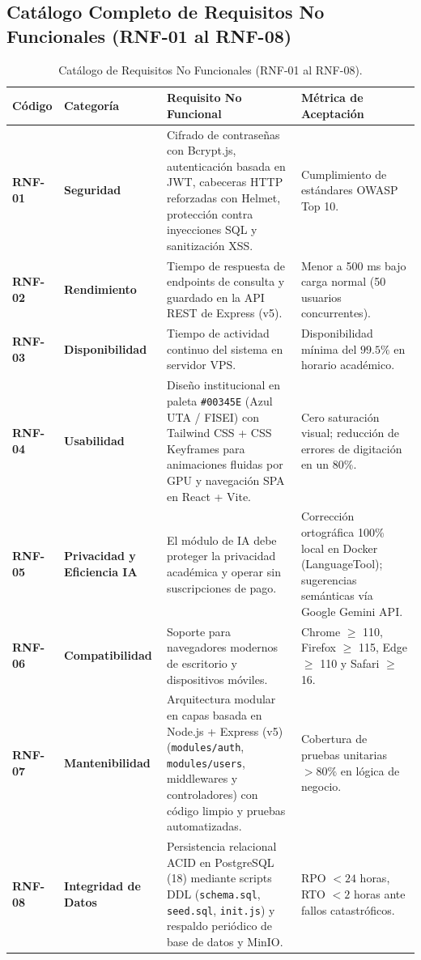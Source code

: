 \documentclass[12pt,a4paper]{article}
\begin{document}
\subsection{Catálogo Completo de Requisitos No Funcionales (RNF-01 al RNF-08)}
\begin{table}[htbp]
\centering
\small
\begin{tabularx}{\textwidth}{|>{\hsize=0.35\hsize\bfseries\centering\arraybackslash}X|>{\hsize=0.65\hsize\bfseries}X|>{\hsize=1.0\hsize}X|>{\hsize=1.0\hsize}X|}
    \hline
    \rowcolor{tableheader}
    Código & Categoría & Requisito No Funcional & Métrica de Aceptación \\
    \hline
    RNF-01 & Seguridad & Cifrado de contraseñas con Bcrypt.js, autenticación basada en JWT, cabeceras HTTP reforzadas con Helmet, protección contra inyecciones SQL y sanitización XSS. & Cumplimiento de estándares OWASP Top 10. \\
    \hline
    RNF-02 & Rendimiento & Tiempo de respuesta de endpoints de consulta y guardado en la API REST de Express (v5). & Menor a 500 ms bajo carga normal (50 usuarios concurrentes). \\
    \hline
    RNF-03 & Disponibilidad & Tiempo de actividad continuo del sistema en servidor VPS. & Disponibilidad mínima del $99.5\%$ en horario académico. \\
    \hline
    RNF-04 & Usabilidad & Diseño institucional en paleta \texttt{\#00345E} (Azul UTA / FISEI) con Tailwind CSS + CSS Keyframes para animaciones fluidas por GPU y navegación SPA en React + Vite. & Cero saturación visual; reducción de errores de digitación en un $80\%$. \\
    \hline
    RNF-05 & Privacidad y Eficiencia IA & El módulo de IA debe proteger la privacidad académica y operar sin suscripciones de pago. & Corrección ortográfica 100\% local en Docker (LanguageTool); sugerencias semánticas vía Google Gemini API. \\
    \hline
    RNF-06 & Compatibilidad & Soporte para navegadores modernos de escritorio y dispositivos móviles. & Chrome $\ge$ 110, Firefox $\ge$ 115, Edge $\ge$ 110 y Safari $\ge$ 16. \\
    \hline
    RNF-07 & Mantenibilidad & Arquitectura modular en capas basada en Node.js + Express (v5) (\texttt{modules/auth}, \texttt{modules/users}, middlewares y controladores) con código limpio y pruebas automatizadas. & Cobertura de pruebas unitarias $> 80\%$ en lógica de negocio. \\
    \hline
    RNF-08 & Integridad de Datos & Persistencia relacional ACID en PostgreSQL (18) mediante scripts DDL (\texttt{schema.sql}, \texttt{seed.sql}, \texttt{init.js}) y respaldo periódico de base de datos y MinIO. & RPO $< 24$ horas, RTO $< 2$ horas ante fallos catastróficos. \\
    \hline
\end{tabularx}
\caption{Catálogo de Requisitos No Funcionales (RNF-01 al RNF-08).}
\label{tab:s1_03_rnf_completo}
\end{table}
\end{document}
